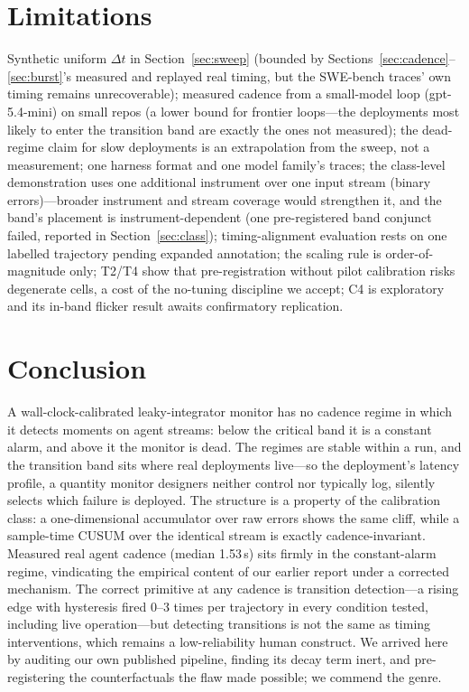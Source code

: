 

\section{Limitations}
\label{sec:limitations}

Synthetic uniform $\Delta t$ in Section~\ref{sec:sweep} (bounded by
Sections~\ref{sec:cadence}--\ref{sec:burst}'s measured and replayed real timing,
but the SWE-bench traces' own timing remains unrecoverable); measured cadence
from a small-model loop (gpt-5.4-mini) on small repos (a lower bound for frontier loops---the
deployments most likely to enter the transition band are exactly the ones not
measured); the dead-regime claim for slow deployments is an extrapolation from
the sweep, not a measurement; one harness format and one model family's traces;
the class-level demonstration uses one additional instrument over one input
stream (binary errors)---broader instrument and stream coverage would strengthen
it, and the band's placement is instrument-dependent (one pre-registered band
conjunct failed, reported in Section~\ref{sec:class}); timing-alignment
evaluation rests on one labelled trajectory pending expanded annotation; the
scaling rule is order-of-magnitude only; T2/T4 show that pre-registration
without pilot calibration risks degenerate cells, a cost of the no-tuning
discipline we accept; C4 is exploratory and its in-band flicker result awaits
confirmatory replication.

\section{Conclusion}
\label{sec:conclusion}

A wall-clock-calibrated leaky-integrator monitor has no cadence regime in which
it detects moments on agent streams: below the critical band it is a constant
alarm, and above it the monitor is dead. The regimes are stable within a run, and the
transition band sits where real deployments live---so the deployment's latency
profile, a quantity monitor designers neither control nor typically log,
silently selects which failure is deployed. The structure is a property of the
calibration class: a one-dimensional accumulator over raw errors shows the same
cliff, while a sample-time CUSUM over the identical stream is exactly
cadence-invariant. Measured real agent cadence (median 1.53\,s) sits firmly in
the constant-alarm regime, vindicating the empirical content of our earlier
report under a corrected mechanism. The correct primitive at any cadence is
transition detection---a rising edge with hysteresis fired 0--3 times per
trajectory in every condition tested, including live operation---but detecting
transitions is not the same as timing interventions, which remains a
low-reliability human construct. We arrived here by auditing our own published
pipeline, finding its decay term inert, and pre-registering the counterfactuals
the flaw made possible; we commend the genre.
